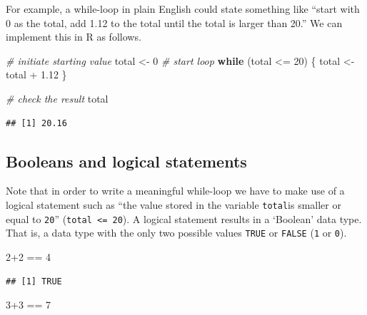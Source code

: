 \documentclass[
  12pt,
]{style/krantz}
\newenvironment{Shaded}{\begin{snugshade}}{\end{snugshade}}
\newcommand{\CommentTok}[1]{\textcolor[rgb]{0.56,0.35,0.01}{\textit{#1}}}
\newcommand{\ControlFlowTok}[1]{\textcolor[rgb]{0.13,0.29,0.53}{\textbf{#1}}}
\newcommand{\DecValTok}[1]{\textcolor[rgb]{0.00,0.00,0.81}{#1}}
\newcommand{\FloatTok}[1]{\textcolor[rgb]{0.00,0.00,0.81}{#1}}
\newcommand{\NormalTok}[1]{#1}
\newcommand{\OtherTok}[1]{\textcolor[rgb]{0.56,0.35,0.01}{#1}}
\newcommand{\SpecialCharTok}[1]{\textcolor[rgb]{0.00,0.00,0.00}{#1}}
\begin{document}
For example, a while-loop in plain English could state something like ``start with 0 as the total, add 1.12 to the total until the total is larger than 20.'' We can implement this in R as follows.

\begin{Shaded}
\begin{Highlighting}[]
\CommentTok{\# initiate starting value}
\NormalTok{total }\OtherTok{\textless{}{-}} \DecValTok{0}
\CommentTok{\# start loop}
\ControlFlowTok{while}\NormalTok{ (total }\SpecialCharTok{\textless{}=} \DecValTok{20}\NormalTok{) \{}
\NormalTok{     total }\OtherTok{\textless{}{-}}\NormalTok{ total }\SpecialCharTok{+} \FloatTok{1.12}
\NormalTok{\}}

\CommentTok{\# check the result}
\NormalTok{total}
\end{Highlighting}
\end{Shaded}

\begin{verbatim}
## [1] 20.16
\end{verbatim}

\hypertarget{booleans-and-logical-statements}{%
\subsection{Booleans and logical statements}\label{booleans-and-logical-statements}}

Note that in order to write a meaningful while-loop we have to make use of a logical statement such as ``the value stored in the variable \texttt{total}is smaller or equal to \texttt{20}'' (\texttt{total\ \textless{}=\ 20}). A logical statement results in a `Boolean' data type. That is, a data type with the only two possible values \texttt{TRUE} or \texttt{FALSE} (\texttt{1} or \texttt{0}).

\begin{Shaded}
\begin{Highlighting}[]
\DecValTok{2}\SpecialCharTok{+}\DecValTok{2} \SpecialCharTok{==} \DecValTok{4}
\end{Highlighting}
\end{Shaded}

\begin{verbatim}
## [1] TRUE
\end{verbatim}

\begin{Shaded}
\begin{Highlighting}[]
\DecValTok{3}\SpecialCharTok{+}\DecValTok{3} \SpecialCharTok{==} \DecValTok{7}
\end{Highlighting}
\end{Shaded}
\end{document}

